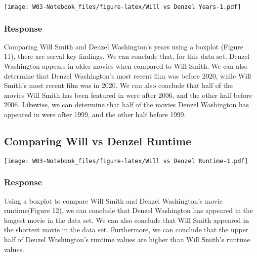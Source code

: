 \documentclass[
]{article}
\newenvironment{Shaded}{\begin{snugshade}}{\end{snugshade}}
\newcommand{\DataTypeTok}[1]{\textcolor[rgb]{0.13,0.29,0.53}{#1}}
\newcommand{\FloatTok}[1]{\textcolor[rgb]{0.00,0.00,0.81}{#1}}
\newcommand{\KeywordTok}[1]{\textcolor[rgb]{0.13,0.29,0.53}{\textbf{#1}}}
\newcommand{\NormalTok}[1]{#1}
\newcommand{\OperatorTok}[1]{\textcolor[rgb]{0.81,0.36,0.00}{\textbf{#1}}}
\newcommand{\StringTok}[1]{\textcolor[rgb]{0.31,0.60,0.02}{#1}}
\begin{document}
\texttt{[image: W03-Notebook\_files/figure-latex/Will vs Denzel Years-1.pdf]}

\hypertarget{response-4}{%
\subsubsection{Response}\label{response-4}}

Comparing Will Smith and Denzel Washington's years using a boxplot
(Figure 11), there are serval key findings. We can conclude that, for
this data set, Denzel Washington appears in older movies when compared
to Will Smith. We can also determine that Denzel Washington's most
recent film was before 2020, while Will Smith's most recent film was in
2020. We can also conclude that half of the movies Will Smith has been
featured in were after 2006, and the other half before 2006. Likewise,
we can determine that half of the movies Denzel Washington has appeared
in were after 1999, and the other half before 1999.

\hypertarget{comparing-will-vs-denzel-runtime}{%
\subsection{Comparing Will vs Denzel
Runtime}\label{comparing-will-vs-denzel-runtime}}

\begin{Shaded}
\end{Shaded}

\texttt{[image: W03-Notebook\_files/figure-latex/Will vs Denzel Runtime-1.pdf]}

\hypertarget{response-5}{%
\subsubsection{Response}\label{response-5}}

Using a boxplot to compare Will Smith and Denzel Washington's movie
runtime(Figure 12), we can conclude that Denzel Washington has appeared
in the longest movie in the data set. We can also conclude that Will
Smith appeared in the shortest movie in the data set. Furthermore, we
can conclude that the upper half of Denzel Washington's runtime values
are higher than Will Smith's runtime values.
\end{document}
